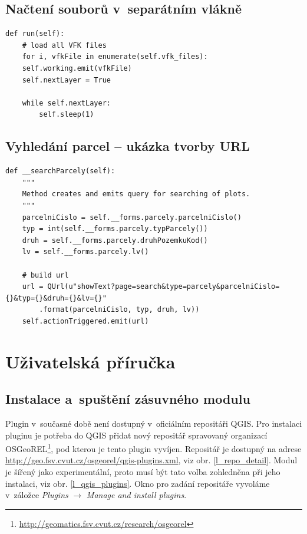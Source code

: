 \documentclass[a4paper,12pt,oneside]{book}
\begin{document}
\section{Načtení souborů v~separátním vlákně}
{\scriptsize
\begin{lstlisting}[style=python, label=l_thread_run]
 def run(self):
    # load all VFK files
    for i, vfkFile in enumerate(self.vfk_files):
	self.working.emit(vfkFile)
	self.nextLayer = True

	while self.nextLayer:
	    self.sleep(1)
\end{lstlisting}
}
\section{Vyhledání parcel -- ukázka tvorby URL}

{\scriptsize
\begin{lstlisting}[style=python, label=l_search_parcely]
def __searchParcely(self):
    """
    Method creates and emits query for searching of plots.
    """
    parcelniCislo = self.__forms.parcely.parcelniCislo()
    typ = int(self.__forms.parcely.typParcely())
    druh = self.__forms.parcely.druhPozemkuKod()
    lv = self.__forms.parcely.lv()

    # build url
    url = QUrl(u"showText?page=search&type=parcely&parcelniCislo={}&typ={}&druh={}&lv={}"
		.format(parcelniCislo, typ, druh, lv))
    self.actionTriggered.emit(url)
\end{lstlisting}
}

\chapter{Uživatelská příručka}
\label{l_prirucka}

\section{Instalace a~spuštění zásuvného modulu}
Plugin v~současné době není dostupný v~oficiálním repositáři QGIS. Pro
instalaci pluginu je potřeba do QGIS přidat nový repositář spravovaný
organizací
OSGeoREL\footnote{\url{http://geomatics.fsv.cvut.cz/research/osgeorel}},
pod kterou je tento plugin vyvíjen. Repositář je dostupný na adrese
\url{http://geo.fsv.cvut.cz/osgeorel/qgis-plugins.xml}, viz
obr. \ref{l_repo_detail}. Modul je šířený jako experimentální, proto
musí být tato volba zohledněna při jeho instalaci, viz
obr. \ref{l_qgis_plugins}. Okno pro zadání repositáře vyvoláme
v~záložce \textit{Plugins} $\rightarrow$ \textit{Manage and install
  plugins}.
\end{document}
